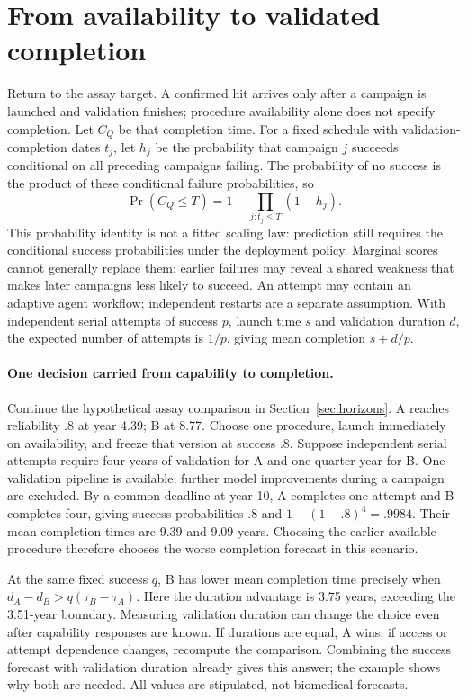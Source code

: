 \section{From availability to validated completion}
\label{sec:domains}
Return to the assay target. A confirmed hit arrives only after a campaign is launched and validation finishes; procedure availability alone does not specify completion. Let $C_Q$ be that completion time. For a fixed schedule with validation-completion dates $t_j$, let $h_j$ be the probability that campaign $j$ succeeds conditional on all preceding campaigns failing. The probability of no success is the product of these conditional failure probabilities, so
\begin{equation}
 \Pr(C_Q\le T)=1-\prod_{j:t_j\le T}(1-h_j).
 \label{eq:completionhazard}
\end{equation}
This probability identity is not a fitted scaling law: prediction still requires the conditional success probabilities under the deployment policy. Marginal scores cannot generally replace them: earlier failures may reveal a shared weakness that makes later campaigns less likely to succeed. An attempt may contain an adaptive agent workflow; independent restarts are a separate assumption. With independent serial attempts of success $p$, launch time $s$ and validation duration $d$, the expected number of attempts is $1/p$, giving mean completion $s+d/p$. \paragraph{One decision carried from capability to completion.}
Continue the hypothetical assay comparison in Section~\ref{sec:horizons}. A reaches reliability $.8$ at year 4.39; B at 8.77. Choose one procedure, launch immediately on availability, and freeze that version at success $.8$. Suppose independent serial attempts require four years of validation for A and one quarter-year for B. One validation pipeline is available; further model improvements during a campaign are excluded. By a common deadline at year 10, A completes one attempt and B completes four, giving success probabilities $.8$ and $1-(1-.8)^4=.9984$. Their mean completion times are 9.39 and 9.09 years. Choosing the earlier available procedure therefore chooses the worse completion forecast in this scenario.

At the same fixed success $q$, B has lower mean completion time precisely when $d_A-d_B>q(\tau_B-\tau_A)$. Here the duration advantage is 3.75 years, exceeding the 3.51-year boundary. Measuring validation duration can change the choice even after capability responses are known. If durations are equal, A wins; if access or attempt dependence changes, recompute the comparison. Combining the success forecast with validation duration already gives this answer; the example shows why both are needed. All values are stipulated, not biomedical forecasts.

